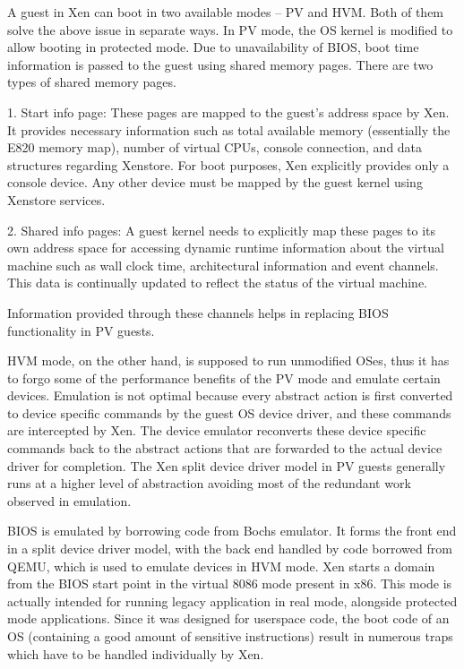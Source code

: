 A guest in Xen can boot in two available modes – PV and HVM. Both of them solve the above issue in separate ways. In PV mode, the OS kernel is modified to allow booting in protected mode. Due to unavailability of BIOS, boot time information is passed to the guest using shared memory pages. There are two types of shared memory pages.

1. Start info page: These pages are mapped to the guest’s address space by Xen. It provides necessary information such as total available memory (essentially the E820 memory map), number of virtual CPUs, console connection, and data structures regarding Xenstore. For boot purposes, Xen explicitly provides only a console device. Any other device must be mapped by the guest kernel using Xenstore services.

2. Shared info pages: A guest kernel needs to explicitly map these pages to its own address space for accessing dynamic runtime information about the virtual machine such as wall clock time, architectural information and event channels. This data is continually updated to reflect the status of the virtual machine.

Information provided through these channels helps in replacing BIOS functionality in PV guests.

HVM mode, on the other hand, is supposed to run unmodified OSes, thus it has to forgo some of the performance benefits of the PV mode and emulate certain devices. Emulation is not optimal because every abstract action is first converted to device specific commands by the guest OS device driver, and these commands are intercepted by Xen. The device emulator reconverts these device specific commands back to the abstract actions that are forwarded to the actual device driver for completion. The Xen split device driver model in PV guests generally runs at a higher level of abstraction avoiding most of the redundant work observed in emulation.

BIOS is emulated by borrowing code from Bochs emulator. It forms the front end in a split device driver model, with the back end handled by code borrowed from QEMU, which is used to emulate devices in HVM mode. Xen starts a domain from the BIOS start point in the virtual 8086 mode present in x86. This mode is actually intended for running legacy application in real mode, alongside protected mode applications. Since it was designed for userspace code, the boot code of an OS (containing a good amount of sensitive instructions) result in numerous traps which have to be handled individually by Xen.

